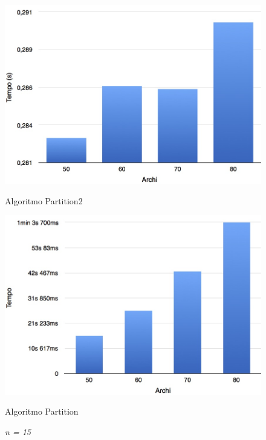 \begin{figure}[h!]
	\vspace*{1cm}
	\begin{minipage}{0.40\textwidth}
		\centering
		\includegraphics[scale=.25]{img/beta4/15_4.jpg}
		\caption{Algoritmo Partition2}
	\end{minipage}\hfill
	\begin{minipage}{0.40\textwidth}
		\centering
		\includegraphics[scale=.25]{img/iole_beta4/iole_15_4.jpg}
		\caption{Algoritmo Partition}
	\end{minipage}
	\caption*{\textit{n = 15}}
\end{figure}
